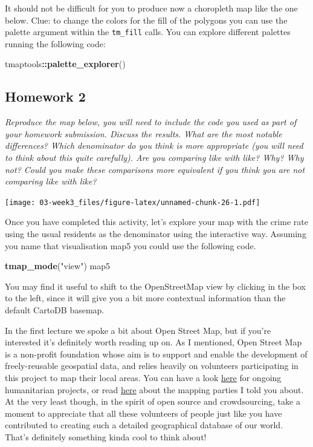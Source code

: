\documentclass[]{book}
\newenvironment{Shaded}{\begin{snugshade}}{\end{snugshade}}
\newcommand{\KeywordTok}[1]{\textcolor[rgb]{0.13,0.29,0.53}{\textbf{#1}}}
\newcommand{\NormalTok}[1]{#1}
\newcommand{\OperatorTok}[1]{\textcolor[rgb]{0.81,0.36,0.00}{\textbf{#1}}}
\newcommand{\StringTok}[1]{\textcolor[rgb]{0.31,0.60,0.02}{#1}}
\begin{document}
It should not be difficult for you to produce now a choropleth map like the one below. Clue: to change the colors for the fill of the polygons you can use the palette argument within the \texttt{tm\_fill} calls. You can explore different palettes running the following code:

\begin{Shaded}
\begin{Highlighting}[]
\NormalTok{tmaptools}\OperatorTok{::}\KeywordTok{palette_explorer}\NormalTok{()}
\end{Highlighting}
\end{Shaded}

\hypertarget{homework-2-1}{%
\subsection{Homework 2}\label{homework-2-1}}

\emph{Reproduce the map below, you will need to include the code you used as part of your homework submission. Discuss the results. What are the most notable differences? Which denominator do you think is more appropriate (you will need to think about this quite carefully). Are you comparing like with like? Why? Why not? Could you make these comparisons more equivalent if you think you are not comparing like with like?}

\texttt{[image: 03-week3\_files/figure-latex/unnamed-chunk-26-1.pdf]}

Once you have completed this activity, let's explore your map with the crime rate using the usual residents as the denominator using the interactive way. Assuming you name that visualisation map5 you could use the following code.

\begin{Shaded}
\begin{Highlighting}[]
\KeywordTok{tmap_mode}\NormalTok{(}\StringTok{"view"}\NormalTok{)}
\NormalTok{map5}
\end{Highlighting}
\end{Shaded}

You may find it useful to shift to the OpenStreetMap view by clicking in the box to the left, since it will give you a bit more contextual information than the default CartoDB basemap.

In the first lecture we spoke a bit about Open Street Map, but if you're interested it's definitely worth reading up on. As I mentioned, Open Street Map is a non-profit foundation whose aim is to support and enable the development of freely-reusable geospatial data, and relies heavily on volunteers participating in this project to map their local areas. You can have a look \href{https://www.hotosm.org/get-involved/disaster-mapping}{here} for ongoing humanitarian projects, or read \href{https://wiki.openstreetmap.org/wiki/Mapping_parties}{here} about the mapping parties I told you about. At the very least though, in the spirit of open source and crowdsourcing, take a moment to appreciate that all these volunteers of people just like you have contributed to creating such a detailed geographical database of our world. That's definitely something kinda cool to think about!
\end{document}
